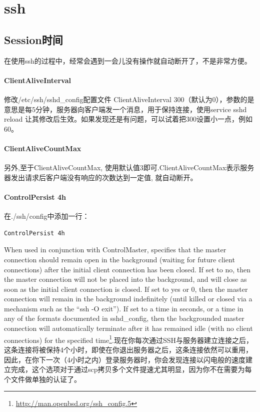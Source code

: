 \documentclass[letter]{book}
\begin{document}
\section{ssh}

\subsection{Session时间}

在使用ssh的过程中，经常会遇到一会儿没有操作就自动断开了，不是非常方便。

\paragraph{ClientAliveInterval}

修改/etc/ssh/sshd\_config配置文件 ClientAliveInterval 300（默认为0），参数的是意思是每5分钟，服务器向客户端发一个消息，用于保持连接，使用service sshd reload 让其修改后生效。如果发现还是有问题，可以试着把300设置小一点，例如60。

\paragraph{ClientAliveCountMax}

另外,至于ClientAliveCountMax, 使用默认值3即可.ClientAliveCountMax表示服务器发出请求后客户端没有响应的次数达到一定值, 就自动断开。

\paragraph{ControlPersist 4h}

在./ssh/config中添加一行：

\begin{lstlisting}[language=Bash]
ControlPersist 4h
\end{lstlisting}

When used in conjunction with ControlMaster, specifies that the master connection should remain open in the background (waiting for future client connections) after the initial client connection has been closed. If set to no, then the master connection will not be placed into the background, and will close as soon as the initial client connection is closed. If set to yes or 0, then the master connection will remain in the background indefinitely (until killed or closed via a mechanism such as the “ssh -O exit”). If set to a time in seconds, or a time in any of the formats documented in sshd\_config, then the backgrounded master connection will automatically terminate after it has remained idle (with no client connections) for the specified time\footnote{\url{http://man.openbsd.org/ssh_config.5}}.现在你每次通过SSH与服务器建立连接之后，这条连接将被保持4个小时，即使在你退出服务器之后，这条连接依然可以重用，因此，在你下一次（4小时之内）登录服务器时，你会发现连接以闪电般的速度建立完成，这个选项对于通过scp拷贝多个文件提速尤其明显，因为你不在需要为每个文件做单独的认证了。
\end{document}
